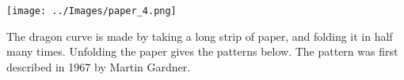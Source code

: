 \documentclass[10pt,a4paper]{article}
\begin{document}
\vspace*{\fill}
\begin{center}
\texttt{[image: ../Images/paper\_4.png]}
\end{center}
\vspace*{\fill}

\begin{center}
\tiny
The dragon curve is made by taking a long strip of paper, and folding it in half many times. Unfolding the paper gives the patterns below. The pattern was first described in 1967 by Martin Gardner.
\end{center}
\end{document}
